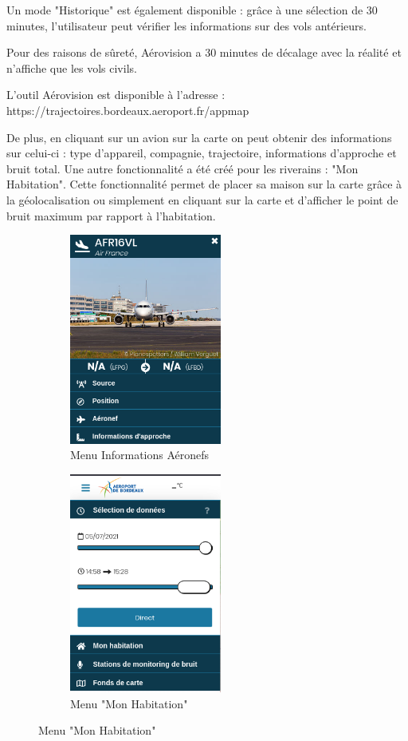 \newpage
Un mode "Historique" est également disponible : grâce à une sélection de 30 minutes, l'utilisateur peut vérifier les informations sur des vols antérieurs.

Pour des raisons de sûreté, Aérovision a 30 minutes de décalage avec la réalité et n'affiche que les vols civils.

L'outil Aérovision est disponible à l'adresse : https://trajectoires.bordeaux.aeroport.fr/appmap\newline

De plus, en cliquant sur un avion sur la carte on peut obtenir des informations sur celui-ci : type d'appareil, compagnie, trajectoire, informations d'approche et bruit total.
Une autre fonctionnalité a été créé pour les riverains : "Mon Habitation". Cette fonctionnalité permet de placer sa maison sur la carte grâce à la géolocalisation ou simplement en cliquant sur la carte et d'afficher le point de bruit maximum par rapport à l'habitation.

\begin{figure}[hbt!]
  \begin{subfigure}{0.5\textwidth}
    \centering
    \includegraphics[width=5cm]{Images/aerovisioninfo.png}  
    \caption{Menu Informations Aéronefs}
    \label{fig:aerovisioninfo}
  \end{subfigure}
  \begin{subfigure}{0.5\textwidth}
    \centering
    \includegraphics[width=5cm]{Images/aerovisionmaison.png}  
    \caption{Menu "Mon Habitation"}
    \label{fig:aerovisionmaison}
  \end{subfigure}
\end{figure}

